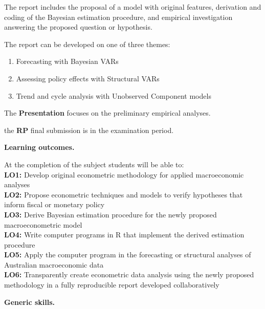 \documentclass[10pt]{article}
\begin{document}
\begin{multicols}{2}
\smallskip\noindent The report includes the proposal of a model with original features, derivation and coding of the Bayesian estimation procedure, and empirical investigation answering the proposed question or hypothesis.

\smallskip\noindent The report can be developed on one of three themes:
\begin{enumerate}
\item Forecasting with Bayesian VARs
\item Assessing policy effects with Structural VARs
\item Trend and cycle analysis with Unobserved Component models
\end{enumerate}

\smallskip\noindent The \textbf{Presentation} focuses on the preliminary empirical analyses.

\smallskip\noindent the \textbf{RP} final submission is in the examination period.

\vfill\null
\columnbreak

\noindent\textbf{Learning outcomes.}

\noindent\smallskip At the completion of the subject students will be able to:\\[1ex]
\textbf{LO1:} Develop original econometric methodology for applied macroeconomic analyses\\[1ex]
\textbf{LO2:} Propose econometric techniques and models to verify hypotheses that inform fiscal or monetary policy\\[1ex]
\textbf{LO3:} Derive Bayesian estimation procedure for the newly proposed macroeconometric model\\[1ex]
\textbf{LO4:} Write computer programs in R that implement the derived estimation procedure\\[1ex]
\textbf{LO5:} Apply the computer program in the forecasting or structural analyses of Australian macroeconomic data\\[1ex]
\textbf{LO6:} Transparently create econometric data analysis using the newly proposed methodology in a fully reproducible report developed collaboratively


\bigskip\noindent\textbf{Generic skills.}


\end{multicols}
\end{document}
